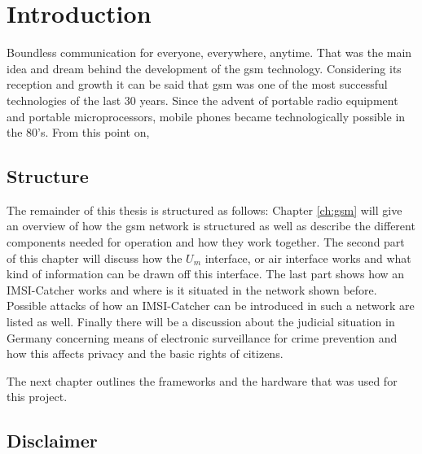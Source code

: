 \chapter{Introduction}
Boundless communication for everyone, everywhere, anytime.
That was the main idea and dream behind the development of the \gls{gsm} technology.
Considering its reception and growth \cite{GSM2009,GSM_history2011,GSM_stats2011} it can be said that \gls{gsm} was one of the most successful technologies of the last 30 years.
Since the advent of portable radio equipment and portable microprocessors, mobile phones became technologically possible in the 80's.
From this point on, 

\section{Structure}
The remainder of this thesis is structured as follows:
Chapter \ref{ch:gsm} will give an overview of how the \gls{gsm} network is structured as well as describe the different components needed for operation and how they work together.
The second part of this chapter will discuss how the $U_m$ interface, or air interface works and what kind of information can be drawn off this interface.
The last part shows how an IMSI-Catcher works and where is it situated in the network shown before.
Possible attacks of how an IMSI-Catcher can be introduced in such a network are listed as well.
Finally there will be a discussion about the judicial situation in Germany concerning means of electronic surveillance for crime prevention and how this affects privacy and the basic rights of citizens.

The next chapter outlines the frameworks and the hardware that was used for this project.

\section{Disclaimer}
